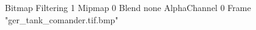 {Bitmap
	{Filtering 1}
	{Mipmap 0}
	{Blend none}
	{AlphaChannel 0}
	{Frame "ger_tank_comander.tif.bmp"}
}
